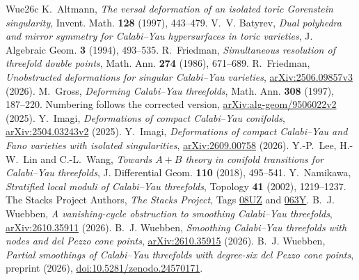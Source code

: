 \begin{thebibliography}{Wue26c}
 K.~Altmann, \emph{The versal deformation of an isolated toric Gorenstein singularity}, Invent. Math. \textbf{128} (1997), 443--479.
 V.~V. Batyrev, \emph{Dual polyhedra and mirror symmetry for Calabi--Yau hypersurfaces in toric varieties}, J. Algebraic Geom. \textbf{3} (1994), 493--535.
 R.~Friedman, \emph{Simultaneous resolution of threefold double points}, Math. Ann. \textbf{274} (1986), 671--689.
 R.~Friedman, \emph{Unobstructed deformations for singular Calabi--Yau varieties}, \href{https://arxiv.org/abs/2506.09857v3}{arXiv:2506.09857v3} (2026).
 M.~Gross, \emph{Deforming Calabi--Yau threefolds}, Math. Ann. \textbf{308} (1997), 187--220. Numbering follows the corrected version, \href{https://arxiv.org/abs/alg-geom/9506022v2}{arXiv:alg-geom/9506022v2} (2025).
 Y.~Imagi, \emph{Deformations of compact Calabi--Yau conifolds}, \href{https://arxiv.org/abs/2504.03243v2}{arXiv:2504.03243v2} (2025).
 Y.~Imagi, \emph{Deformations of compact Calabi--Yau and Fano varieties with isolated singularities}, \href{https://arxiv.org/abs/2609.00758}{arXiv:2609.00758} (2026).
 Y.-P.~Lee, H.-W.~Lin and C.-L.~Wang, \emph{Towards $A+B$ theory in conifold transitions for Calabi--Yau threefolds}, J. Differential Geom. \textbf{110} (2018), 495--541.
 Y.~Namikawa, \emph{Stratified local moduli of Calabi--Yau threefolds}, Topology \textbf{41} (2002), 1219--1237.
 The Stacks Project Authors, \emph{The Stacks Project}, Tags \href{https://stacks.math.columbia.edu/tag/08UZ}{08UZ} and \href{https://stacks.math.columbia.edu/tag/063Y}{063Y}.
 B.~J. Wuebben, \emph{A vanishing-cycle obstruction to smoothing Calabi--Yau threefolds}, \href{https://arxiv.org/abs/2610.35911}{arXiv:2610.35911} (2026).
 B.~J. Wuebben, \emph{Smoothing Calabi--Yau threefolds with nodes and del Pezzo cone points}, \href{https://arxiv.org/abs/2610.35915}{arXiv:2610.35915} (2026).
 B.~J. Wuebben, \emph{Partial smoothings of Calabi--Yau threefolds with degree-six del Pezzo cone points}, preprint (2026), \href{https://doi.org/10.5281/zenodo.24570171}{doi:10.5281/zenodo.24570171}.
\end{thebibliography}
